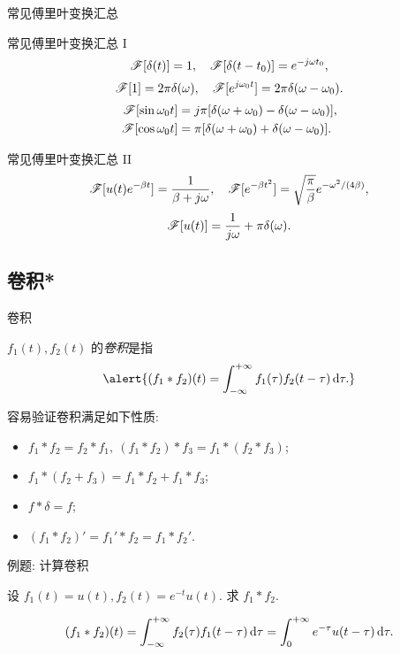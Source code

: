 \begin{frame}{常见傅里叶变换汇总}
	\onslide<+->
	\begin{second}{常见傅里叶变换汇总 I}
		\[\mathscr{F}[\delta(t)]=1,\quad \mathscr{F}[\delta(t-t_0)]=e^{-j\omega t_0},\]
		\[\mathscr{F}[1]=2\pi\delta(\omega),\quad \mathscr{F}[e^{j\omega_0 t}]=2\pi\delta(\omega-\omega_0).\]
		\begin{align*}
		\mathscr{F}[\sin \omega_0t]&=j\pi[\delta(\omega+\omega_0)-\delta(\omega-\omega_0)],\\
		\mathscr{F}[\cos{\omega_0 t}]&=\pi[\delta(\omega+\omega_0)+\delta(\omega-\omega_0)].
		\end{align*}
	\end{second}

	\onslide<+->
	\begin{main}{常见傅里叶变换汇总 II}
		\[\mathscr{F}[u(t)e^{-\beta t}]=\dfrac1{\beta+j\omega},\quad
		\mathscr{F}[e^{-\beta t^2}]=\sqrt{\dfrac\pi\beta}e^{-\omega^2/(4\beta)},\]
		\[\mathscr{F}[u(t)]=\dfrac1{j\omega}+\pi\delta(\omega).\]
	\end{main}
\end{frame}


\subsection{卷积*}
\begin{frame}{卷积\noexer}
	\onslide<+->
	\begin{definition}
		$f_1(t),f_2(t)$ 的\emph{卷积}是指
		\[\alert{(f_1\ast f_2)(t)=\int_{-\infty}^{+\infty} f_1(\tau)f_2(t-\tau)\diff \tau.}\]
	\end{definition}

	\onslide<+->
	容易验证卷积满足如下性质:
	\begin{itemize}
		\item $f_1\ast f_2=f_2\ast f_1,\ (f_1\ast f_2)\ast f_3=f_1\ast(f_2\ast f_3)$;
		\item $f_1\ast(f_2+f_3)=f_1\ast f_2+f_1\ast f_3$;
		\item $f\ast\delta=f$;
		\item $(f_1\ast f_2)'=f_1'\ast f_2=f_1\ast f_2'$.
	\end{itemize}
\end{frame}


\begin{frame}{例题: 计算卷积\noexer}
	\onslide<+->
	\begin{example}
		设 $f_1(t)=u(t),f_2(t)=e^{-t}u(t)$. 求 $f_1\ast f_2$.
	\end{example}

	\onslide<+->
	\begin{solution}
			\[(f_1\ast f_2)(t)=\int_{-\infty}^{+\infty} f_2(\tau)f_1(t-\tau)\,\mathrm{d} \tau=\int_0^{+\infty} e^{-\tau}u(t-\tau)\,\mathrm{d} \tau.\]
		\onslide<+->{故 $(f_1\ast f_2)(t)=(1-e^{-t})u(t)$.
		}
	\end{solution}
\end{frame}


